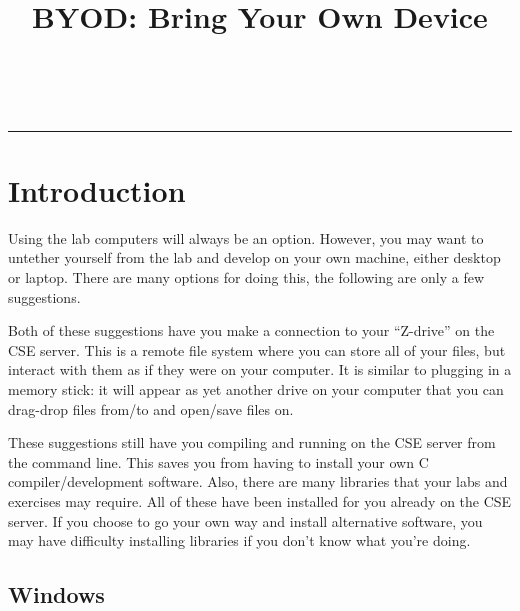 \documentclass[12pt]{scrartcl}
\title{BYOD: Bring Your Own Device}\let\Title\@title
\subtitle{Developing C on Your Own Machine \\
Computer Science I\\
{\small
\vskip.5cm
Department of Computer Science \& Engineering \\
University of Nebraska--Lincoln}
\vskip-2cm}
\date{~}
\begin{document}
\maketitle

\hrule

\section*{Introduction}

Using the lab computers will always be an option.  However, you may want to
untether yourself from the lab and develop on your own machine, either desktop
or laptop.  There are many options for doing this, the following are only
a few suggestions.

Both of these suggestions have you make a connection to your ``Z-drive'' 
on the CSE server.  This is a remote file system where you can store all
of your files, but interact with them as if they were on your computer.
It is similar to plugging in a memory stick: it will appear as yet another
drive on your computer that you can drag-drop files from/to and open/save
files on.  

These suggestions still have you compiling and running on the CSE server
from the command line.  This saves you from having to install your own C 
compiler/development software.  Also, there are many libraries that your
labs and exercises may require.  All of these have been installed for you
already on the CSE server.  If you choose to go your own way and install
alternative software, you may have difficulty installing libraries if you
don't know what you're doing.

\subsection*{Windows}
\end{document}
